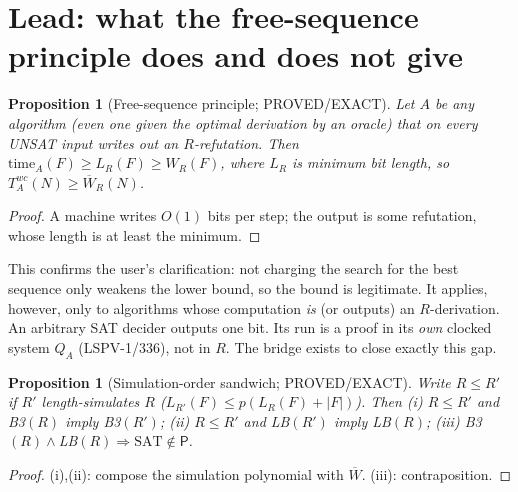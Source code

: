 \documentclass[11pt]{article}
\newtheorem{proposition}[theorem]{Proposition}
\theoremstyle{definition}
\newcommand{\SAT}{\mathrm{SAT}}
\newcommand{\Wb}{\overline W}
\begin{document}
\section{Lead: what the free-sequence principle does and does not give}

\begin{proposition}[Free-sequence principle; PROVED/EXACT]\label{prop:free}
Let $A$ be any algorithm (even one given the optimal derivation by an oracle)
that on every UNSAT input \emph{writes out} an $R$-refutation. Then
$\mathrm{time}_A(F)\ge L_R(F)\ge W_R(F)$, where $L_R$ is minimum bit length,
so $T^{wc}_A(N)\ge\Wb_R(N)$.
\end{proposition}
\begin{proof}A machine writes $O(1)$ bits per step; the output is some
refutation, whose length is at least the minimum. \end{proof}

This confirms the user's clarification: not charging the search for the best
sequence only weakens the lower bound, so the bound is legitimate. It applies,
however, only to algorithms whose computation \emph{is} (or outputs) an
$R$-derivation. An arbitrary SAT decider outputs one bit. Its run is a proof
in its \emph{own} clocked system $Q_A$ (LSPV-1/336), not in $R$. The bridge
exists to close exactly this gap.

\begin{proposition}[Simulation-order sandwich; PROVED/EXACT]\label{prop:sandwich}
Write $R\le R'$ if $R'$ length-simulates $R$
($L_{R'}(F)\le p(L_R(F)+|F|)$). Then
(i) $R\le R'$ and B3$(R)$ imply B3$(R')$; (ii) $R\le R'$ and LB$(R')$ imply LB$(R)$;
(iii) B3$(R)\wedge$LB$(R)\Rightarrow \SAT\notin\mathsf P$.
\end{proposition}
\begin{proof}(i),(ii): compose the simulation polynomial with $\Wb$.
(iii): contraposition. \end{proof}
\end{document}
